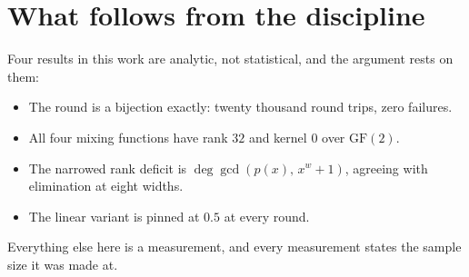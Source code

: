 \section{What follows from the discipline}

Four results in this work are analytic, not statistical, and the argument rests on them:

\begin{itemize}
  \item The round is a bijection exactly: twenty thousand round trips, zero failures.
  \item All four mixing functions have rank \(32\) and kernel \(0\) over \(\mathrm{GF}(2)\).
  \item The narrowed rank deficit is \(\deg \gcd(p(x),\, x^w + 1)\), agreeing with elimination at eight widths.
  \item The linear variant is pinned at \(0.5\) at every round.
\end{itemize}

Everything else here is a measurement, and every measurement states the sample size it was made at.
